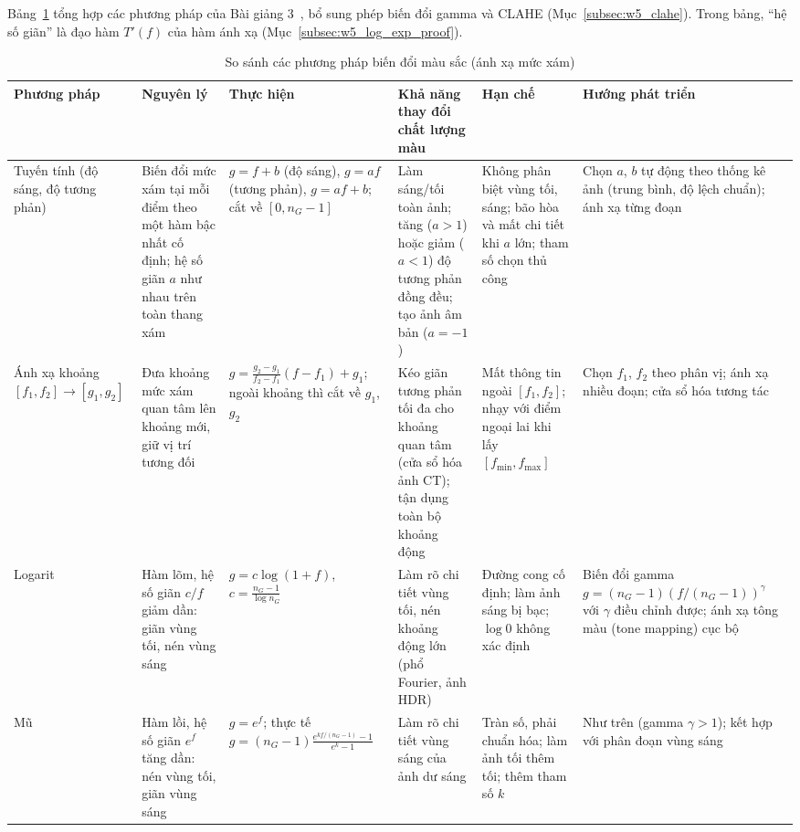 Bảng~\ref{tab:w5_compare} tổng hợp các phương pháp của Bài giảng 3~\citep{xlav_lec3}, bổ sung phép biến đổi gamma và CLAHE (Mục~\ref{subsec:w5_clahe}). Trong bảng, ``hệ số giãn'' là đạo hàm $T'(f)$ của hàm ánh xạ (Mục~\ref{subsec:w5_log_exp_proof}).

\begin{table}[!htbp]
\centering
\scriptsize
\caption{So sánh các phương pháp biến đổi màu sắc (ánh xạ mức xám)}
\label{tab:w5_compare}
\renewcommand{\arraystretch}{1.3}
\begin{tabularx}{\textwidth}{|p{1.45cm}|p{2.2cm}|p{2.35cm}|X|X|X|}
\hline
\textbf{Phương pháp} & \textbf{Nguyên lý} & \textbf{Thực hiện} & \textbf{Khả năng thay đổi chất lượng màu} & \textbf{Hạn chế} & \textbf{Hướng phát triển} \\
\hline
Tuyến tính (độ sáng, độ tương phản) & Biến đổi mức xám tại mỗi điểm theo một hàm bậc nhất cố định; hệ số giãn $a$ như nhau trên toàn thang xám & $g = f + b$ (độ sáng), $g = a f$ (tương phản), $g = a f + b$; cắt về $[0, n_G - 1]$ & Làm sáng/tối toàn ảnh; tăng ($a > 1$) hoặc giảm ($a < 1$) độ tương phản đồng đều; tạo ảnh âm bản ($a = -1$) & Không phân biệt vùng tối, sáng; bão hòa và mất chi tiết khi $a$ lớn; tham số chọn thủ công & Chọn $a$, $b$ tự động theo thống kê ảnh (trung bình, độ lệch chuẩn); ánh xạ từng đoạn \\
\hline
Ánh xạ khoảng $[f_1, f_2] \to [g_1, g_2]$ & Đưa khoảng mức xám quan tâm lên khoảng mới, giữ vị trí tương đối & $g = \frac{g_2 - g_1}{f_2 - f_1}(f - f_1) + g_1$; ngoài khoảng thì cắt về $g_1$, $g_2$ & Kéo giãn tương phản tối đa cho khoảng quan tâm (cửa sổ hóa ảnh CT); tận dụng toàn bộ khoảng động & Mất thông tin ngoài $[f_1, f_2]$; nhạy với điểm ngoại lai khi lấy $[f_{\min}, f_{\max}]$ & Chọn $f_1$, $f_2$ theo phân vị; ánh xạ nhiều đoạn; cửa sổ hóa tương tác \\
\hline
Logarit & Hàm lõm, hệ số giãn $c/f$ giảm dần: giãn vùng tối, nén vùng sáng & $g = c \log(1 + f)$, $c = \frac{n_G - 1}{\log n_G}$ & Làm rõ chi tiết vùng tối, nén khoảng động lớn (phổ Fourier, ảnh HDR) & Đường cong cố định; làm ảnh sáng bị bạc; $\log 0$ không xác định & Biến đổi gamma $g = (n_G - 1)(f/(n_G - 1))^{\gamma}$ với $\gamma$ điều chỉnh được; ánh xạ tông màu (tone mapping) cục bộ \\
\hline
Mũ & Hàm lồi, hệ số giãn $e^{f}$ tăng dần: nén vùng tối, giãn vùng sáng & $g = e^{f}$; thực tế $g = (n_G - 1)\frac{e^{k f/(n_G - 1)} - 1}{e^k - 1}$ & Làm rõ chi tiết vùng sáng của ảnh dư sáng & Tràn số, phải chuẩn hóa; làm ảnh tối thêm tối; thêm tham số $k$ & Như trên (gamma $\gamma > 1$); kết hợp với phân đoạn vùng sáng \\

\end{tabularx}
\end{table}
